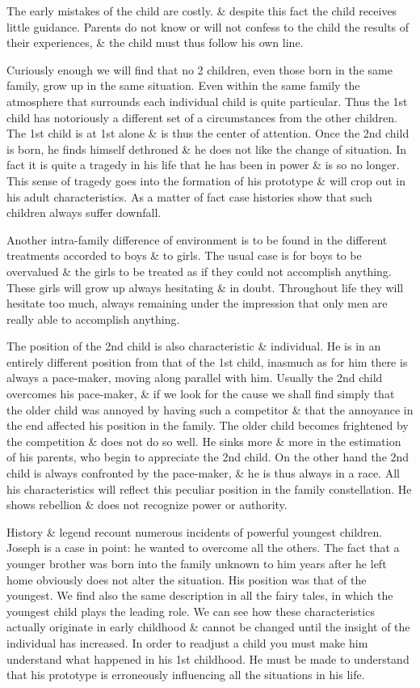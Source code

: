 \documentclass{article}
\begin{document}
The early mistakes of the child are costly. \& despite this fact the child receives little guidance. Parents do not know or will not confess to the child the results of their experiences, \& the child must thus follow his own line.

Curiously enough we will find that no 2 children, even those born in the same family, grow up in the same situation. Even within the same family the atmosphere that surrounds each individual child is quite particular. Thus the 1st child has notoriously a different set of a circumstances from the other children. The 1st child is at 1st alone \& is thus the center of attention. Once the 2nd child is born, he finds himself dethroned \& he does not like the change of situation. In fact it is quite a tragedy in his life that he has been in power \& is so no longer. This sense of tragedy goes into the formation of his prototype \& will crop out in his adult characteristics. As a matter of fact case histories show that such children always suffer downfall.

Another intra-family difference of environment is to be found in the different treatments accorded to boys \& to girls. The usual case is for boys to be overvalued \& the girls to be treated as if they could not accomplish anything. These girls will grow up always hesitating \& in doubt. Throughout life they will hesitate too much, always remaining under the impression that only men are really able to accomplish anything.

The position of the 2nd child is also characteristic \& individual. He is in an entirely different position from that of the 1st child, inasmuch as for him there is always a pace-maker, moving along parallel with him. Usually the 2nd child overcomes his pace-maker, \& if we look for the cause we shall find simply that the older child was annoyed by having such a competitor \& that the annoyance in the end affected his position in the family. The older child becomes frightened by the competition \& does not do so well. He sinks more \& more in the estimation of his parents, who begin to appreciate the 2nd child. On the other hand the 2nd child is always confronted by the pace-maker, \& he is thus always in a race. All his characteristics will reflect this peculiar position in the family constellation. He shows rebellion \& does not recognize power or authority.

History \& legend recount numerous incidents of powerful youngest children. Joseph is a case in point: he wanted to overcome all the others. The fact that a younger brother was born into the family unknown to him years after he left home obviously does not alter the situation. His position was that of the youngest. We find also the same description in all the fairy tales, in which the youngest child plays the leading role. We can see how these characteristics actually originate in early childhood \& cannot be changed until the insight of the individual has increased. In order to readjust a child you must make him understand what happened in his 1st childhood. He must be made to understand that his prototype is erroneously influencing all the situations in his life.
\end{document}
